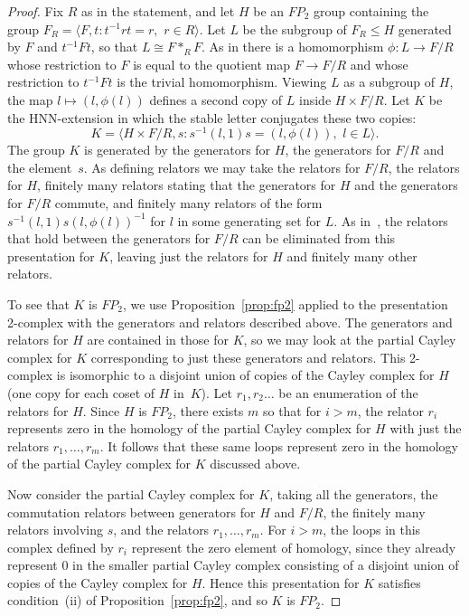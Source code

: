 \documentclass[12pt,a4paper]{article}
\begin{document}
\begin{proof} 
Fix $R$ as in the statement, and let $H$ be an $FP_2$ group containing
the group $F_R=\langle F, t\colon t^{-1}rt = r,\,\, r\in R\rangle$.
Let $L$ be the subgroup of $F_R\leq H$ generated by $F$ and
$t^{-1}Ft$, so that $L\cong F*_RF$.  As in \cite[IV.7.6]{lynsch} there
is a homomorphism $\phi:L\rightarrow F/R$ whose restriction to $F$ is
equal to the quotient map $F\rightarrow F/R$ and whose restriction to
$t^{-1}Ft$ is the trivial homomorphism.  Viewing $L$ as a subgroup of
$H$, the map $l\mapsto (l,\phi(l))$ defines a second copy of $L$
inside $H\times F/R$.  Let $K$ be the HNN-extension in which the
stable letter conjugates these two copies:
$$K= 
\langle H\times F/R, s\colon s^{-1}(l,1)s = (l,\phi(l)), \,\, l\in
L\rangle.$$ 
The group $K$ is generated by the generators for $H$, the generators 
for $F/R$ and the element~$s$.  As defining relators we may take the 
relators for $F/R$, the relators for $H$, finitely many relators 
stating that the generators for $H$ and the generators for $F/R$ 
commute, and finitely many relators of the form 
$s^{-1}(l,1)s(l,\phi(l))^{-1}$ for $l$ in some generating set for $L$.  
As in~\cite[IV.7.6]{lynsch}, the relators that hold between the 
generators for $F/R$ can be eliminated from this presentation for $K$, 
leaving just the relators for $H$ and finitely many other relators.  

To see that $K$ is $FP_2$, we use Proposition~\ref{prop:fp2} applied 
to the presentation 2-complex with the generators and relators 
described above.  The generators and relators for $H$ are contained 
in those for $K$, so we may look at the partial Cayley complex for 
$K$ corresponding to just these generators and relators.  This 
2-complex is isomorphic to a disjoint union of copies of the Cayley
complex for $H$ (one copy for each coset of $H$ in~$K$).  Let 
$r_1,r_2\ldots$ be an enumeration of the relators for $H$.  Since 
$H$ is $FP_2$, there exists $m$ so that for $i>m$, the relator $r_i$ 
represents zero in the homology of the partial Cayley complex for 
$H$ with just the relators $r_1,\ldots,r_m$.  It follows that these 
same loops represent zero in the homology of the partial Cayley 
complex for $K$ discussed above.  

Now consider the partial Cayley complex
for $K$, taking all the generators, the commutation relators between 
generators for $H$ and $F/R$, the finitely many relators involving 
$s$, and the relators $r_1,\ldots,r_m$.  For $i>m$, the loops in 
this complex defined by $r_i$ represent the zero element of homology, 
since they already represent 0 in the smaller partial Cayley complex 
consisting of a disjoint union of copies of the Cayley complex for
$H$.  Hence this presentation for $K$ satisfies condition~(ii) of 
Proposition~\ref{prop:fp2}, and so $K$ is $FP_2$.  
\end{proof} 
\end{document}
